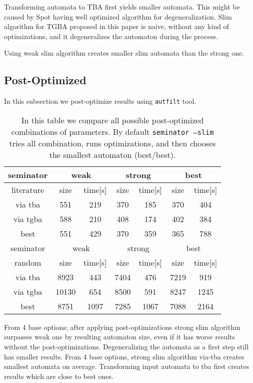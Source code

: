 \documentclass[
	digital
nolof, nolot
]{fithesis3}
\begin{document}
	

	
	
	Transforming automata to TBA first yields smaller automata. This might be caused by Spot having well optimized algorithm for degeneralization. Slim algorithm for TGBA proposed in this paper is naive, without any kind of optimizations, and it degeneralizes the automaton during the process.
	
	Using weak slim algorithm creates smaller slim automata than the strong one. 

	\subsection{Post-Optimized}
	In this subsection we post-optimize results using \texttt{autfilt} tool.
	
	\begin{table}[ht]
		\centering
		\caption{In this table we compare all possible post-optimized combinations of parameters. By default \texttt{seminator --slim} tries all combination, runs optimizations, and then chooses the smallest automaton (best/best). }
		\begin{tabular}{ |c||c|c|c|c|c|c| } 
			\hline
			seminator&\multicolumn{2}{c|}{weak}&\multicolumn{2}{c|}{strong}&\multicolumn{2}{c|}{best} \\
			\hline
			literature&size&time[s]&size&time[s]&size&time[s]\\
			\hhline{|=======|}
			
			via tba&551&219& 370 &185& 370&404\\
			\hline
			via tgba&588&210& 408&174& 402&384\\ 
			\hline
			best&551&429& 370&359& 365&788 \\ 
			\hline
			
			
			\hline
			seminator&\multicolumn{2}{c|}{weak}&\multicolumn{2}{c|}{strong}&\multicolumn{2}{c|}{best} \\
			\hline
			random&size&time[s]&size&time[s]&size&time[s]\\
			\hhline{|=======|}
			via tba&8923&443& 7404 &476& 7219&919\\
			\hline
			via tgba&10130&654& 8500&591& 8247&1245\\ 
			\hline
			best&8751&1097& 7285&1067& 7088&2164 \\ 
			\hline
		\end{tabular}
	\end{table}

	
	From 4 base options; after applying post-optimizations strong slim algorithm surpasses weak one by resulting automaton size, even if it has worse results without the post-optimizations.
	Degeneralizing the automata as a first step still has smaller results.
	From 4 base options, strong slim algorithm via-tba creates smallest automata on average.
	Transforming input automata to tba first creates results which are close to best ones. 
	
\end{document}
